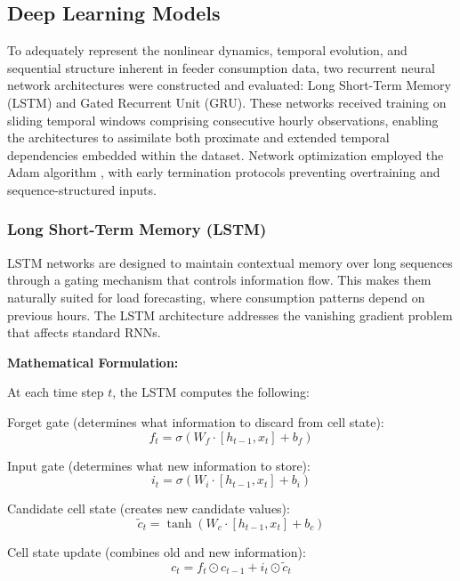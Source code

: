 \documentclass[oneside, 12pt]{book}
\numberwithin{equation}{chapter}
\newcommand{\sizexii}{\fontsize{12pt}{6pt}\selectfont}
\begin{document}
\subsection{\sizexii Deep Learning Models}

To adequately represent the nonlinear dynamics, temporal evolution, and sequential structure inherent in feeder consumption data, two recurrent neural network architectures were constructed and evaluated: Long Short-Term Memory (LSTM) and Gated Recurrent Unit (GRU). These networks received training on sliding temporal windows comprising consecutive hourly observations, enabling the architectures to assimilate both proximate and extended temporal dependencies embedded within the dataset. Network optimization employed the Adam algorithm \parencite{kingma2014adam}, with early termination protocols preventing overtraining and sequence-structured inputs.

\subsubsection{Long Short-Term Memory (LSTM)}

LSTM networks \parencite{hochreiter1997lstm} are designed to maintain contextual memory over long sequences through a gating mechanism that controls information flow. This makes them naturally suited for load forecasting, where consumption patterns depend on previous hours. The LSTM architecture addresses the vanishing gradient problem that affects standard RNNs.

\textbf{Mathematical Formulation:}

At each time step $t$, the LSTM computes the following:

Forget gate (determines what information to discard from cell state):
\begin{equation}
f_t = \sigma(W_f \cdot [h_{t-1}, x_t] + b_f)
\end{equation}

Input gate (determines what new information to store):
\begin{equation}
i_t = \sigma(W_i \cdot [h_{t-1}, x_t] + b_i)
\end{equation}

Candidate cell state (creates new candidate values):
\begin{equation}
\tilde{c}_t = \tanh(W_c \cdot [h_{t-1}, x_t] + b_c)
\end{equation}

Cell state update (combines old and new information):
\begin{equation}
c_t = f_t \odot c_{t-1} + i_t \odot \tilde{c}_t
\end{equation}
\end{document}
